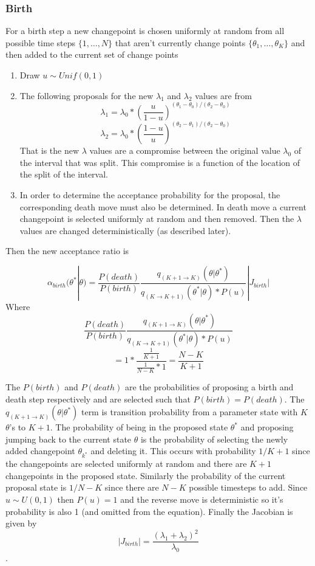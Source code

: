 \documentclass[11pt,a4paper]{article}
\numberwithin{equation}{section}
\begin{document}
\hypertarget{birth}{%
\subsubsection{Birth}\label{birth}}

For a birth step a new changepoint is chosen uniformly at random from
all possible time steps \(\{1,\dots,N\}\) that aren't currently change
points \(\{\theta_1,\dots,\theta_K\}\) and then added to the current set
of change points

\begin{enumerate}
\def\labelenumi{\arabic{enumi}.}
\item
  Draw \(u \sim Unif(0,1)\)
\item
  The following proposals for the new \(\lambda_1\) and \(\lambda_2\)
  values are from
  \[\lambda_1 = \lambda_0*(\frac{u}{1-u})^{(\theta_1-\theta_0)/(\theta_2-\theta_0)}\]
  \[\lambda_2 = \lambda_0*(\frac{1-u}{u})^{(\theta_2-\theta_1)/(\theta_2-\theta_0)}\]
  That is the new \(\lambda\) values are a compromise between the
  original value \(\lambda_0\) of the interval that was split. This
  compromise is a function of the location of the split of the interval.
\item
  In order to determine the acceptance probability for the proposal, the
  corresponding death move must also be determined. In death move a
  current changepoint is selected uniformly at random and then removed.
  Then the \(\lambda\) values are changed deterministically (as
  described later).
\end{enumerate}

Then the new acceptance ratio is

\[\alpha_{birth}(\theta^*|\theta) = \frac{P(death)}{P(birth)}\frac{q_{(K+1\rightarrow K)}(\theta|\theta^*)}{q_{(K\rightarrow K + 1)}(\theta^*|\theta)*P(u)}|J_{birth}|\]
Where
\[  \frac{P(death)}{P(birth)}\frac{q_{(K+1\rightarrow K)}(\theta|\theta^*)}{q_{(K\rightarrow K + 1)}(\theta^*|\theta)*P(u)} \]
\[= 1*\frac{\frac{1}{K+1}}{\frac{1}{N-K}*1} = \frac{N-K}{K+1} \]

The \(P(birth)\) and \(P(death)\) are the probabilities of proposing a
birth and death step respectively and are selected such that
\(P(birth) = P(death)\). The \(q_{(K+1\rightarrow K)}(\theta|\theta^*)\)
term is transition probability from a parameter state with \(K\)
\(\theta\)'s to \(K+1\). The probability of being in the proposed state
\(\theta^*\) and proposing jumping back to the current state \(\theta\)
is the probability of selecting the newly added changepoint
\(\theta_{k^*}\) and deleting it. This occurs with probability \(1/K+1\)
since the changepoints are selected uniformly at random and there are
\(K+1\) changepoints in the proposed state. Similarly the probability of
the current proposal state is \(1/N-K\) since there are \(N-K\) possible
timesteps to add. Since \(u \sim U(0,1)\) then \(P(u) = 1\) and the
reverse move is deterministic so it's probability is also 1 (and omitted
from the equation). Finally the Jacobian is given by
\[ |J_{birth}| = \frac{(\lambda_1 + \lambda_2)^2}{\lambda_0}\] .
\end{document}

